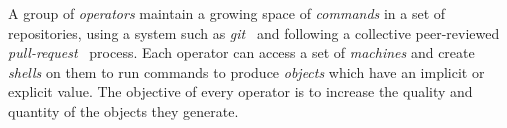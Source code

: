 A group of \emph{operators} maintain a growing space of \emph{commands} in a set of repositories, using a system such as \emph{git}~\cite{git} and following a collective peer-reviewed \emph{pull-request}~\cite{pull_request} process. Each operator can access a set of \emph{machines} and create \emph{shells} on them to run commands to produce \emph{objects} which have an implicit or explicit value. The objective of every operator is to increase the quality and quantity of the objects they generate.
